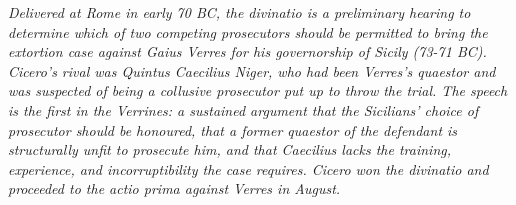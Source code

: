 
\textit{Delivered at Rome in early 70 BC, the divinatio is a preliminary
hearing to determine which of two competing prosecutors should be
permitted to bring the extortion case against Gaius Verres for his
governorship of Sicily (73-71 BC). Cicero's rival was Quintus Caecilius
Niger, who had been Verres's quaestor and was suspected of being a
collusive prosecutor put up to throw the trial. The speech is the first
in the Verrines: a sustained argument that the Sicilians' choice of
prosecutor should be honoured, that a former quaestor of the defendant
is structurally unfit to prosecute him, and that Caecilius lacks the
training, experience, and incorruptibility the case requires. Cicero
won the divinatio and proceeded to the actio prima against Verres in
August.}
